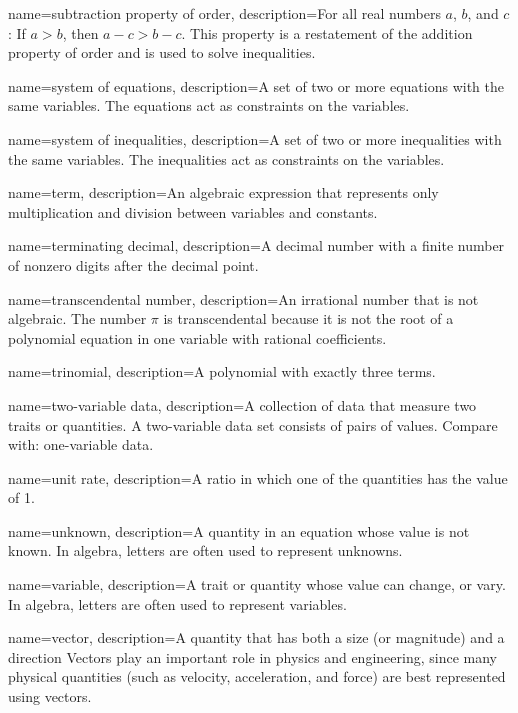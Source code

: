  {
	name=subtraction property of order,
	description={For all real numbers $a$, $b$, and $c$: If $a > b$, then $a - c > b - c$. This property is a restatement of the \gls{addition property of order} and is used to solve inequalities.}
}

 {
	name=system of equations,
	description={A set of two or more equations with the same variables. The equations act as constraints on the variables.}
}

 {
	name=system of inequalities,
	description={A set of two or more inequalities with the same variables. The inequalities act as constraints on the variables.}
}

 {
	name=term,
	description={An algebraic expression that represents only multiplication and division between variables and constants.}
}

 {
	name=terminating decimal,
	description={A decimal number with a finite number of nonzero digits after the decimal point.}
}

 {
	name=transcendental number,
	description={An irrational number that is not algebraic. The number $\pi$ is transcendental because it is not the root of a polynomial equation in one variable with rational coefficients.}
}

 {
	name=trinomial,
	description={A polynomial with exactly three terms.}
}

 {
	name=two-variable data,
	description={A collection of data that measure two traits or quantities. A two-variable data set consists of pairs of values. Compare with: \gls{one-variable data}.}
}

 {
	name=unit rate,
	description={A ratio in which one of the quantities has the value of 1.}
}

 {
	name=unknown,
	description={A quantity in an equation whose value is not known. In algebra, letters are often used to represent unknowns.}
}

 {
	name=variable,
	description={A trait or quantity whose value can change, or vary. In algebra, letters are often used to represent variables.}
}

 {
	name=vector,
	description={A quantity that has both a size (or magnitude) and a direction Vectors play an important role in physics and engineering, since many physical quantities (such as velocity, acceleration, and force) are best represented using vectors.}
}

